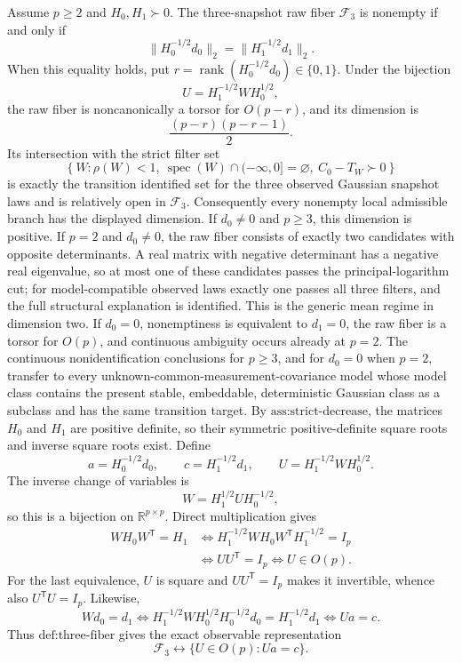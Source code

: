 Assume \(p\ge 2\) and \(H_0,H_1\succ0\).  The three-snapshot raw fiber \(\mathcal F_3\) is nonempty if and only if
\[
 \lVert H_0^{-1/2}d_0\rVert_2=\lVert H_1^{-1/2}d_1\rVert_2.
\]
When this equality holds, put \(r=\operatorname{rank}(H_0^{-1/2}d_0)\in\{0,1\}\).  Under the bijection
\[
 U=H_1^{-1/2}WH_0^{1/2},
\]
the raw fiber is noncanonically a torsor for \(O(p-r)\), and its dimension is
\[
 \frac{(p-r)(p-r-1)}{2}.
\]
Its intersection with the strict filter set
\[
 \left\{W:\rho(W)<1,\ \operatorname{spec}(W)\cap(-\infty,0]=\varnothing,\ C_0-T_W\succ0\right\}
\]
is exactly the transition identified set for the three observed Gaussian snapshot laws and is relatively open in \(\mathcal F_3\).  Consequently every nonempty local admissible branch has the displayed dimension.  If \(d_0\ne0\) and \(p\ge3\), this dimension is positive.  If \(p=2\) and \(d_0\ne0\), the raw fiber consists of exactly two candidates with opposite determinants.  A real matrix with negative determinant has a negative real eigenvalue, so at most one of these candidates passes the principal-logarithm cut; for model-compatible observed laws exactly one passes all three filters, and the full structural explanation is identified.  This is the generic mean regime in dimension two.  If \(d_0=0\), nonemptiness is equivalent to \(d_1=0\), the raw fiber is a torsor for \(O(p)\), and continuous ambiguity occurs already at \(p=2\).  The continuous nonidentification conclusions for \(p\ge3\), and for \(d_0=0\) when \(p=2\), transfer to every unknown-common-measurement-covariance model whose model class contains the present stable, embeddable, deterministic Gaussian class as a subclass and has the same transition target.
By \(\text{ass:strict-decrease}\), the matrices \(H_0\) and \(H_1\) are positive definite, so their symmetric positive-definite square roots and inverse square roots exist.  Define
\[
 a=H_0^{-1/2}d_0,\qquad c=H_1^{-1/2}d_1,
 \qquad U=H_1^{-1/2}WH_0^{1/2}.
\]
The inverse change of variables is
\[
 W=H_1^{1/2}UH_0^{-1/2},
\]
so this is a bijection on \(\mathbb R^{p\times p}\).  Direct multiplication gives
\[
 \begin{aligned}
 WH_0W^{\mathsf T}=H_1
 &\Longleftrightarrow
 H_1^{-1/2}WH_0W^{\mathsf T}H_1^{-1/2}=I_p\\
 &\Longleftrightarrow UU^{\mathsf T}=I_p
 \Longleftrightarrow U\in O(p).
 \end{aligned}
\]
For the last equivalence, \(U\) is square and \(UU^{\mathsf T}=I_p\) makes it invertible, whence also \(U^{\mathsf T}U=I_p\).  Likewise,
\[
 Wd_0=d_1
 \Longleftrightarrow
 H_1^{-1/2}WH_0^{1/2}H_0^{-1/2}d_0=H_1^{-1/2}d_1
 \Longleftrightarrow Ua=c.
\]
Thus \(\text{def:three-fiber}\) gives the exact observable representation
\[
 \mathcal F_3\longleftrightarrow\{U\in O(p):Ua=c\}.
\]

